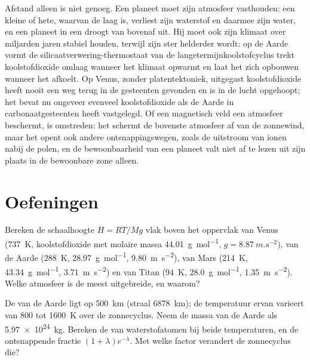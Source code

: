Afstand alleen is niet genoeg. Een planeet moet zijn atmosfeer vasthouden: een kleine
of hete, waarvan de  laag is, verliest zijn waterstof en daarmee
zijn water, en een planeet in een  droogt van bovenaf uit. Hij
moet ook zijn klimaat over miljarden jaren stabiel houden, terwijl zijn ster
helderder wordt: op de Aarde vormt de silicaatverwering-thermostaat van de
langetermijnkoolstofcyclus trekt koolstofdioxide omlaag wanneer het klimaat opwarmt
en laat het zich opbouwen wanneer het afkoelt. Op Venus, zonder platentektoniek,
uitgegast koolstofdioxide heeft nooit een weg terug in de gesteenten gevonden en
is in de lucht opgehoopt; het bevat nu ongeveer evenveel koolstofdioxide als de
Aarde in carbonaatgesteenten heeft vastgelegd. Of een magnetisch veld een
atmosfeer beschermt, is omstreden: het schermt de bovenste atmosfeer af van de
zonnewind, maar het opent ook andere ontsnappingswegen, zoals de uitstroom van ionen
nabij de polen, en de bewoonbaarheid van een planeet valt niet af te lezen
uit zijn plaats in de bewoonbare zone alleen.

\section{Oefeningen}

\begin{exercise}[$\star$]\label{exo:b3:planetary-atmospheres:1}
Bereken de schaalhoogte $H = RT/Mg$ vlak boven het oppervlak van Venus
(\qty{737}{K}, koolstofdioxide met molaire massa \qty{44.01}{g.mol^{-1}},
$g = \qty{8.87}{m.s^{-2}}$), van de Aarde (\qty{288}{K},
\qty{28.97}{g.mol^{-1}}, \qty{9.80}{m.s^{-2}}), van Mars (\qty{214}{K},
\qty{43.34}{g.mol^{-1}}, \qty{3.71}{m.s^{-2}}) en van Titan (\qty{94}{K},
\qty{28.0}{g.mol^{-1}}, \qty{1.35}{m.s^{-2}}). Welke atmosfeer is de
meest uitgebreide, en waarom?
\end{exercise}

\begin{exercise}[$\star$]\label{exo:b3:planetary-atmospheres:2}
De  van de Aarde ligt op \qty{500}{km} (straal \qty{6878}{km});
de temperatuur ervan varieert van 800 tot \qty{1600}{K} over de zonnecyclus.
Neem de massa van de Aarde als \qty{5.97e24}{kg}. Bereken de 
van waterstofatomen bij beide temperaturen, en de ontsnappende fractie
$(1 + \lambda)e^{-\lambda}$. Met welke factor verandert de zonnecyclus die?
\end{exercise}

